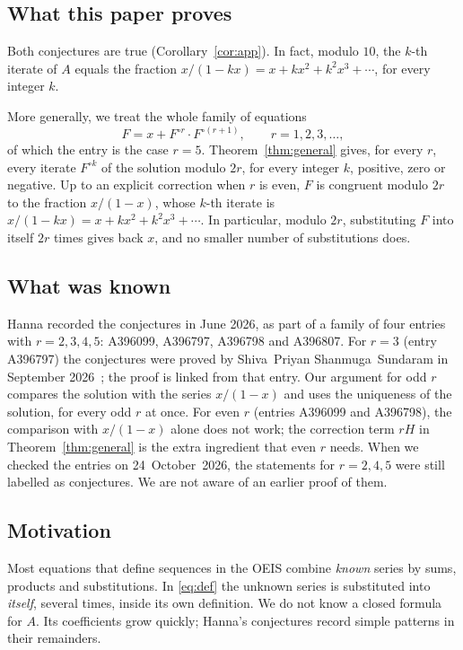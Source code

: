 \documentclass[11pt,a4paper]{article}
\theoremstyle{definition}
\theoremstyle{remark}
\begin{document}
\subsection{What this paper proves}
Both conjectures are true (Corollary~\ref{cor:app}). In fact, modulo $10$, the $k$-th iterate of $A$
equals the fraction $x/(1-kx)=x+kx^2+k^2x^3+\cdots$, for every integer $k$.

More generally, we treat the whole family of equations
\[
F=x+F^{\circ r}\cdot F^{\circ(r+1)},\qquad r=1,2,3,\dots,
\]
of which the entry is the case $r=5$. Theorem~\ref{thm:general} gives, for every $r$, every
iterate $F^{\circ k}$ of the solution modulo $2r$, for every integer $k$, positive, zero or negative. Up to an
explicit correction when $r$ is even, $F$ is congruent modulo $2r$ to the fraction $x/(1-x)$, whose $k$-th iterate is $x/(1-kx)=x+kx^2+k^2x^3+\cdots$. In particular, modulo $2r$, substituting $F$ into
itself $2r$ times gives back $x$, and no smaller number of substitutions does.

\subsection{What was known}
Hanna recorded the conjectures in June 2026, as part of a family of four entries with $r=2,3,4,5$:
A396099, A396797, A396798 and A396807. For $r=3$ (entry A396797) the conjectures were proved by Shiva~Priyan
Shanmuga~Sundaram in September 2026~\cite{sundaram}; the proof is linked from that entry. Our argument for odd $r$ compares
the solution with the series $x/(1-x)$ and uses the uniqueness of the solution, for every odd $r$ at
once. For even $r$ (entries A396099 and A396798), the comparison with $x/(1-x)$ alone does not work; the correction term $rH$ in
Theorem~\ref{thm:general} is the extra ingredient that even $r$ needs. When we checked the entries on
24~October~2026, the statements for $r=2,4,5$ were still labelled as conjectures. We are not aware of an earlier proof
of them.

\subsection{Motivation}
Most equations that define sequences in the OEIS combine \emph{known} series by sums, products and substitutions.
In \eqref{eq:def} the unknown series is substituted into \emph{itself}, several times, inside its own definition.
We do not know a closed formula for $A$. Its coefficients grow quickly; Hanna's conjectures record simple patterns in
their remainders.
\end{document}
